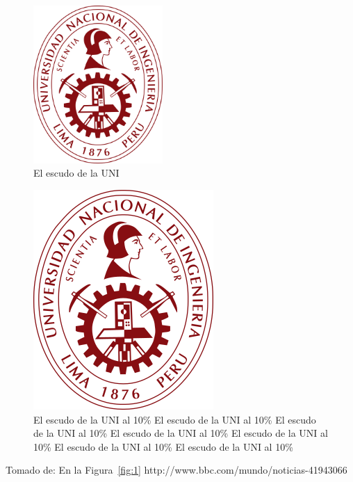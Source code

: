\documentclass[12pt,a4paer]{article}
\begin{document}
\begin{figure}[H]
\centering
\includegraphics[height=6cm]{logo}
\caption{El escudo de la UNI}\label{fig_1}
\end{figure}

\begin{figure}[H]
	\centering
	\includegraphics[scale=0.1]{logo}
	\caption[El escudo de la UNI al 10\%]{El escudo de la UNI al 10\% El escudo de la UNI al 10\% El escudo de la UNI al 10\% El escudo de la UNI al 10\% El escudo de la UNI al 10\% El escudo de la UNI al 10\% El escudo de la UNI al 10\%}
\end{figure}

Tomado de:
En la Figura~\ref{fig:1}
http://www.bbc.com/mundo/noticias-41943066
\end{document}
